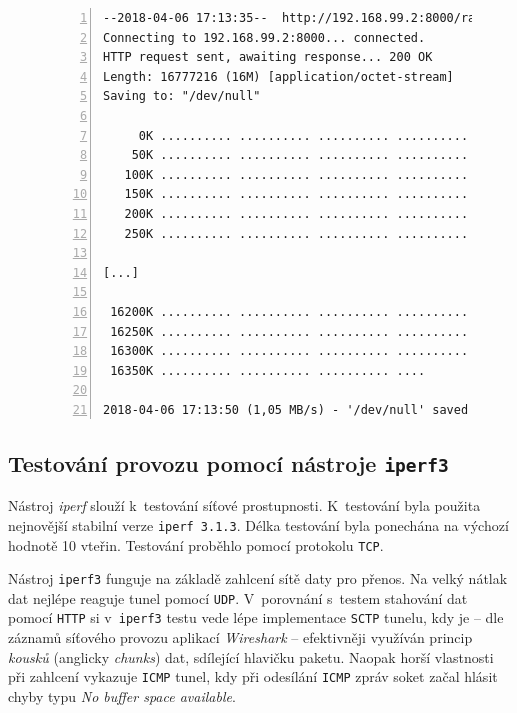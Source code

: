 \documentclass[thesis=M,czech]{FITthesis}[2012/10/20]
\begin{document}
    
    \begin{figure}[h]
	\begin{lstlisting}[label=code:wget,caption=Ukázkový výstup příkazu \texttt{wget},frame=single,numbers=left,linewidth=1.1\textwidth]
--2018-04-06 17:13:35--  http://192.168.99.2:8000/random.16
Connecting to 192.168.99.2:8000... connected.
HTTP request sent, awaiting response... 200 OK
Length: 16777216 (16M) [application/octet-stream]
Saving to: "/dev/null"

     0K .......... .......... .......... .......... ..........  0% 1,01K 17s
    50K .......... .......... .......... .......... ..........  0% 1,07M 16s
   100K .......... .......... .......... .......... ..........  0% 1,04M 15s
   150K .......... .......... .......... .......... ..........  1% 1,07M 15s
   200K .......... .......... .......... .......... ..........  1% 1,07M 15s
   250K .......... .......... .......... .......... ..........  1% 1,04M 15s

[...]

 16200K .......... .......... .......... .......... .......... 99% 1,07M 0s
 16250K .......... .......... .......... .......... .......... 99% 1,04M 0s
 16300K .......... .......... .......... .......... .......... 99% 1,07M 0s
 16350K .......... .......... .......... ....                         100% 1,04M=15s

2018-04-06 17:13:50 (1,05 MB/s) - '/dev/null' saved [16777216/16777216]
      \end{lstlisting}
    \end{figure}

\subsection{Testování provozu pomocí nástroje \texttt{iperf3}}
\label{test:iperf3}

Nástroj \textit{iperf} slouží k~testování síťové prostupnosti. K~testování byla použita nejnovější stabilní verze \texttt{iperf 3.1.3}. Délka testování byla ponechána na výchozí hodnotě 10 vteřin. Testování proběhlo pomocí protokolu \texttt{TCP}.

Nástroj \texttt{iperf3} funguje na základě zahlcení sítě daty pro přenos. Na velký nátlak dat nejlépe reaguje tunel pomocí \texttt{UDP}. V~porovnání s~testem stahování dat pomocí \texttt{HTTP} si v~\texttt{iperf3} testu vede lépe implementace \texttt{SCTP} tunelu, kdy je -- dle záznamů síťového provozu aplikací \textit{Wireshark} -- efektivněji využíván princip \textit{kousků} (anglicky \textit{chunks}) dat, sdílející hlavičku paketu. Naopak horší vlastnosti při zahlcení vykazuje \texttt{ICMP} tunel, kdy při odesílání \texttt{ICMP} zpráv soket začal hlásit chyby typu \textit{No buffer space available}.
\end{document}
